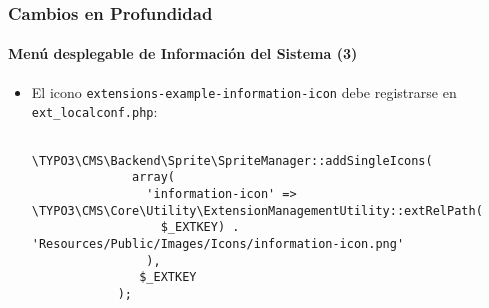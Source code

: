 \begin{frame}[fragile]
	\frametitle{Cambios en Profundidad}
	\framesubtitle{Menú desplegable de Información del Sistema (3)}

	\lstset{basicstyle=\tiny\ttfamily}

	\begin{itemize}
		\item El icono \texttt{extensions-example-information-icon} debe registrarse en \texttt{ext\_localconf.php}:
		\begin{lstlisting}
			\TYPO3\CMS\Backend\Sprite\SpriteManager::addSingleIcons(
			  array(
			    'information-icon' => \TYPO3\CMS\Core\Utility\ExtensionManagementUtility::extRelPath(
			      $_EXTKEY) . 'Resources/Public/Images/Icons/information-icon.png'
			    ),
			   $_EXTKEY
			);
		\end{lstlisting}

	\end{itemize}

\end{frame}


